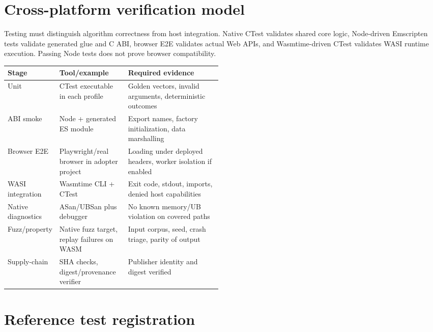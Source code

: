 \documentclass[11pt,letterpaper]{article}
\begin{document}
\frontmatterdoc
\section{Cross-platform verification model}
Testing must distinguish algorithm correctness from host integration. Native CTest validates shared core logic, Node-driven Emscripten tests validate generated glue and C ABI, browser E2E validates actual Web APIs, and Wasmtime-driven CTest validates WASI runtime execution. Passing Node tests does not prove browser compatibility.

\noindent\begin{tabularx}{\linewidth}{>{\raggedright\arraybackslash}p{0.17\linewidth}>{\raggedright\arraybackslash}p{0.32\linewidth}>{\raggedright\arraybackslash}X}
\toprule Stage & Tool/example & Required evidence \\ \midrule
Unit & CTest executable in each profile & Golden vectors, invalid arguments, deterministic outcomes \\
ABI smoke & Node + generated ES module & Export names, factory initialization, data marshalling \\
Browser E2E & Playwright/real browser in adopter project & Loading under deployed headers, worker isolation if enabled \\
WASI integration & Wasmtime CLI + CTest & Exit code, stdout, imports, denied host capabilities \\
Native diagnostics & ASan/UBSan plus debugger & No known memory/UB violation on covered paths \\
Fuzz/property & Native fuzz target, replay failures on WASM & Input corpus, seed, crash triage, parity of output \\
Supply-chain & SHA checks, digest/provenance verifier & Publisher identity and digest verified \\
\bottomrule
\end{tabularx}

\section{Reference test registration}


\end{document}
